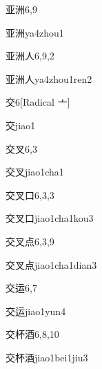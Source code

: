 \begin{entry}{亚洲}{6,9}
  \begin{phonetics}{亚洲}{ya4zhou1}
  \end{phonetics}
\end{entry}

\begin{entry}{亚洲人}{6,9,2}
  \begin{phonetics}{亚洲人}{ya4zhou1ren2}
  \end{phonetics}
\end{entry}

\begin{entry}{交}{6}[Radical 亠]
  \begin{phonetics}{交}{jiao1}
  \end{phonetics}
\end{entry}

\begin{entry}{交叉}{6,3}
  \begin{phonetics}{交叉}{jiao1cha1}
  \end{phonetics}
\end{entry}

\begin{entry}{交叉口}{6,3,3}
  \begin{phonetics}{交叉口}{jiao1cha1kou3}
  \end{phonetics}
\end{entry}

\begin{entry}{交叉点}{6,3,9}
  \begin{phonetics}{交叉点}{jiao1cha1dian3}
  \end{phonetics}
\end{entry}

\begin{entry}{交运}{6,7}
  \begin{phonetics}{交运}{jiao1yun4}
  \end{phonetics}
\end{entry}

\begin{entry}{交杯酒}{6,8,10}
  \begin{phonetics}{交杯酒}{jiao1bei1jiu3}
  \end{phonetics}
\end{entry}

